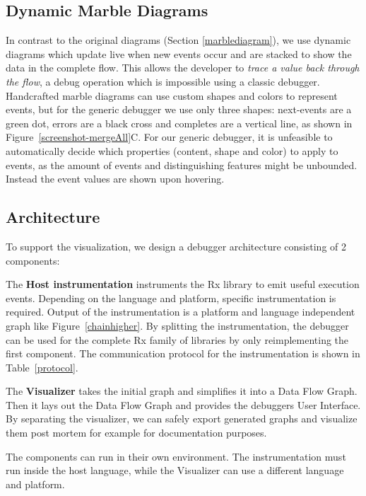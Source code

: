 \subsection{Dynamic Marble Diagrams}
In contrast to the original diagrams (Section \ref{marblediagram}), we use dynamic diagrams which update live when new events occur and are stacked to show the data in the complete flow. This allows the developer to \emph{trace a value back through the flow}, a debug operation which is impossible using a classic debugger. Handcrafted marble diagrams can use custom shapes and colors to represent events, but for the generic debugger we use only three shapes: next-events are a green dot, errors are a black cross and completes are a vertical line, as shown in Figure~\ref{screenshot-mergeAll}C. For our generic debugger, it is unfeasible to automatically decide which properties (content, shape and color) to apply to events, as the amount of events and distinguishing features might be unbounded. Instead the event values are shown upon hovering.

\subsection{Architecture}
To support the visualization, we design a debugger architecture consisting of 2 components:

The \textbf{Host instrumentation} instruments the Rx library to emit useful execution events. Depending on the language and platform, specific instrumentation is required. Output of the instrumentation is a platform and language independent graph like Figure~\ref{chainhigher}. By splitting the instrumentation, the debugger can be used for the complete Rx family of libraries by only reimplementing the first component. The communication protocol for the instrumentation is shown in Table~\ref{protocol}. 

The \textbf{Visualizer} takes the initial graph and simplifies it into a Data Flow Graph. Then it lays out the Data Flow Graph and provides the debuggers User Interface. By separating the visualizer, we can safely export generated graphs and visualize them post mortem for example for documentation purposes.

The components can run in their own environment. The instrumentation must run inside the host language, while the Visualizer can use a different language and platform.

